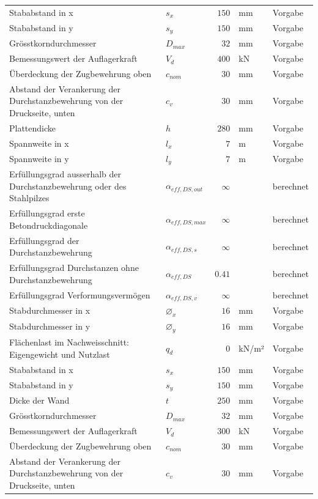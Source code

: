 \documentclass[11pt,a4paper]{article}
\begin{document}
\begin{xltabular}{\linewidth}{>{\raggedright\arraybackslash}Xlrll}
Stababstand in x & $s_x$ & $150$ & mm & Vorgabe \\
Stababstand in y & $s_y$ & $150$ & mm & Vorgabe \\
Grösstkorndurchmesser & $D_{max}$ & $32$ & mm & Vorgabe \\
Bemessungswert der Auflagerkraft & $V_d$ & $400$ & kN & Vorgabe \\
Überdeckung der Zugbewehrung oben & $c_{nom}$ & $30$ & mm & Vorgabe \\
Abstand der Verankerung der Durchstanzbewehrung von der Druckseite, unten & $c_v$ & $30$ & mm & Vorgabe \\
Plattendicke & $h$ & $280$ & mm & Vorgabe \\
Spannweite in x & $l_x$ & $7$ & m & Vorgabe \\
Spannweite in y & $l_y$ & $7$ & m & Vorgabe \\
Erfüllungsgrad ausserhalb der Durchstanzbewehrung oder des Stahlpilzes & $\alpha_{eff,DS,out}$ & $\infty$ &  & berechnet \\
Erfüllungsgrad erste Betondruckdiagonale & $\alpha_{eff,DS,max}$ & $\infty$ &  & berechnet \\
Erfüllungsgrad der Durchstanzbewehrung & $\alpha_{eff,DS,s}$ & $\infty$ &  & berechnet \\
Erfüllungsgrad Durchstanzen ohne Durchstanzbewehrung & $\alpha_{eff,DS}$ & $0.41$ &  & berechnet \\
Erfüllungsgrad Verformungsvermögen & $\alpha_{eff,DS,v}$ & $\infty$ &  & berechnet \\
Stabdurchmesser in x & $\varnothing_x$ & $16$ & mm & Vorgabe \\
Stabdurchmesser in y & $\varnothing_y$ & $16$ & mm & Vorgabe \\
Flächenlast im Nachweisschnitt: Eigengewicht und Nutzlast & $q_d$ & $0$ & kN/m² & Vorgabe \\
Stababstand in x & $s_x$ & $150$ & mm & Vorgabe \\
Stababstand in y & $s_y$ & $150$ & mm & Vorgabe \\
Dicke der Wand & $t$ & $250$ & mm & Vorgabe \\
Grösstkorndurchmesser & $D_{max}$ & $32$ & mm & Vorgabe \\
Bemessungswert der Auflagerkraft & $V_d$ & $300$ & kN & Vorgabe \\
Überdeckung der Zugbewehrung oben & $c_{nom}$ & $30$ & mm & Vorgabe \\
Abstand der Verankerung der Durchstanzbewehrung von der Druckseite, unten & $c_v$ & $30$ & mm & Vorgabe \\

\end{xltabular}
\end{document}
